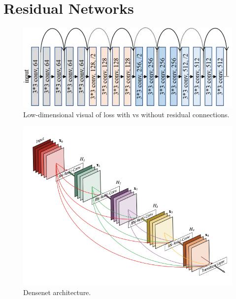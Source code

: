 \section{Residual Networks} 

  \begin{figure}[H]
    \centering 
    \includegraphics[scale=0.4]{img/resnet_loss.png}
    \caption{Low-dimensional visual of loss with vs without residual connections. } 
    \label{fig:resnet_loss}
  \end{figure}

  \begin{figure}[H]
    \centering 
    \includegraphics[scale=0.4]{img/densenet.png}
    \caption{Densenet architecture. } 
    \label{fig:densenet_architecture}
  \end{figure}

